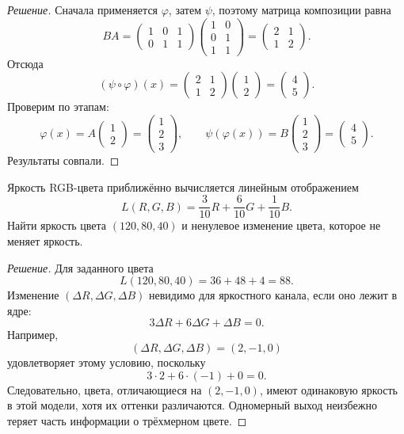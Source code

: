 \begin{proof}[Решение]
Сначала применяется \(\varphi\), затем \(\psi\), поэтому матрица композиции равна
\[
BA=
\begin{pmatrix}
1&0&1\\
0&1&1
\end{pmatrix}
\begin{pmatrix}
1&0\\
0&1\\
1&1
\end{pmatrix}
=
\begin{pmatrix}
2&1\\
1&2
\end{pmatrix}.
\]
Отсюда
\[
(\psi\circ\varphi)(x)
=
\begin{pmatrix}
2&1\\
1&2
\end{pmatrix}
\begin{pmatrix}
1\\2
\end{pmatrix}
=
\begin{pmatrix}
4\\5
\end{pmatrix}.
\]
Проверим по этапам:
\[
\varphi(x)
=
A
\begin{pmatrix}
1\\2
\end{pmatrix}
=
\begin{pmatrix}
1\\2\\3
\end{pmatrix},
\qquad
\psi(\varphi(x))
=
B
\begin{pmatrix}
1\\2\\3
\end{pmatrix}
=
\begin{pmatrix}
4\\5
\end{pmatrix}.
\]
Результаты совпали.
\end{proof}

\begin{problem}
Яркость RGB-цвета приближённо вычисляется линейным отображением
\[
L(R,G,B)
=
\frac{3}{10}R+\frac{6}{10}G+\frac{1}{10}B.
\]
Найти яркость цвета \((120,80,40)\) и ненулевое изменение цвета, которое не меняет яркость.
\end{problem}

\begin{proof}[Решение]
Для заданного цвета
\[
L(120,80,40)
=
36+48+4
=
88.
\]
Изменение \((\Delta R,\Delta G,\Delta B)\) невидимо для яркостного канала, если оно лежит в ядре:
\[
3\Delta R+6\Delta G+\Delta B=0.
\]
Например,
\[
(\Delta R,\Delta G,\Delta B)=(2,-1,0)
\]
удовлетворяет этому условию, поскольку
\[
3\cdot2+6\cdot(-1)+0=0.
\]
Следовательно, цвета, отличающиеся на \((2,-1,0)\), имеют одинаковую яркость в этой модели, хотя их оттенки различаются. Одномерный выход неизбежно теряет часть информации о трёхмерном цвете.
\end{proof}

